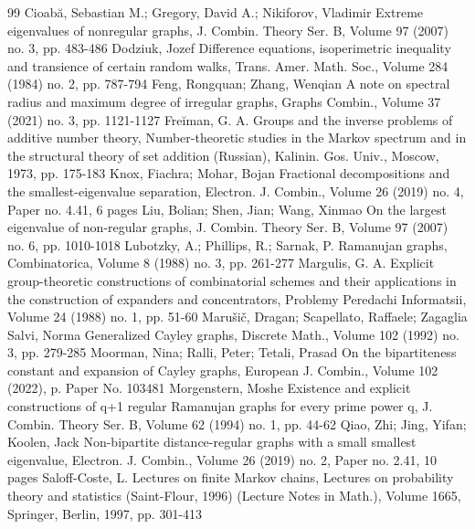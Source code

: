 \documentclass[10pt]{article}
\theoremstyle{definition}
\begin{document}
\begin{thebibliography}{99}
Cioabă, Sebastian M.; Gregory, David A.; Nikiforov, Vladimir Extreme eigenvalues of nonregular graphs, J. Combin. Theory Ser. B, Volume 97 (2007) no. 3, pp. 483-486
Dodziuk, Jozef Difference equations, isoperimetric inequality and transience of certain random walks, Trans. Amer. Math. Soc., Volume 284 (1984) no. 2, pp. 787-794
Feng, Rongquan; Zhang, Wenqian A note on spectral radius and maximum degree of irregular graphs, Graphs Combin., Volume 37 (2021) no. 3, pp. 1121-1127
Freĭman, G. A. Groups and the inverse problems of additive number theory, Number-theoretic studies in the Markov spectrum and in the structural theory of set addition (Russian), Kalinin. Gos. Univ., Moscow, 1973, pp. 175-183
Knox, Fiachra; Mohar, Bojan Fractional decompositions and the smallest-eigenvalue separation, Electron. J. Combin., Volume 26 (2019) no. 4, Paper no. 4.41, 6 pages
Liu, Bolian; Shen, Jian; Wang, Xinmao On the largest eigenvalue of non-regular graphs, J. Combin. Theory Ser. B, Volume 97 (2007) no. 6, pp. 1010-1018
Lubotzky, A.; Phillips, R.; Sarnak, P. Ramanujan graphs, Combinatorica, Volume 8 (1988) no. 3, pp. 261-277
Margulis, G. A. Explicit group-theoretic constructions of combinatorial schemes and their applications in the construction of expanders and concentrators, Problemy Peredachi Informatsii, Volume 24 (1988) no. 1, pp. 51-60
Marušič, Dragan; Scapellato, Raffaele; Zagaglia Salvi, Norma Generalized Cayley graphs, Discrete Math., Volume 102 (1992) no. 3, pp. 279-285
Moorman, Nina; Ralli, Peter; Tetali, Prasad On the bipartiteness constant and expansion of Cayley graphs, European J. Combin., Volume 102 (2022), p. Paper No. 103481
Morgenstern, Moshe Existence and explicit constructions of q+1 regular Ramanujan graphs for every prime power q, J. Combin. Theory Ser. B, Volume 62 (1994) no. 1, pp. 44-62
Qiao, Zhi; Jing, Yifan; Koolen, Jack Non-bipartite distance-regular graphs with a small smallest eigenvalue, Electron. J. Combin., Volume 26 (2019) no. 2, Paper no. 2.41, 10 pages
Saloff-Coste, L. Lectures on finite Markov chains, Lectures on probability theory and statistics (Saint-Flour, 1996) (Lecture Notes in Math.), Volume 1665, Springer, Berlin, 1997, pp. 301-413

\end{thebibliography}
\end{document}
